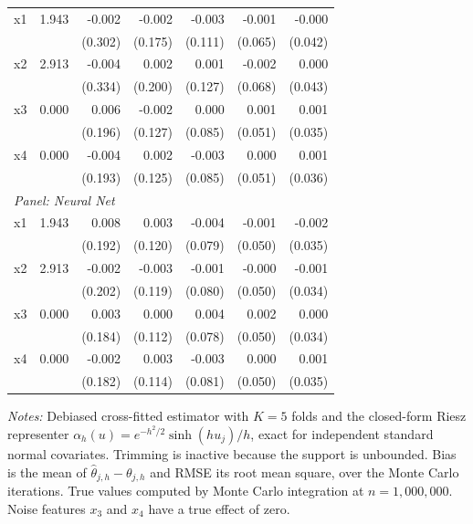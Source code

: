 \documentclass[12pt]{article}
\begin{document}
\begin{table}[htbp]
\begin{threeparttable}
\begin{tabular}{lrrrrrr}
				\quad x1 & 1.943 & -0.002 & -0.002 & -0.003 & -0.001 & -0.000 \\
				&  & (0.302) & (0.175) & (0.111) & (0.065) & (0.042) \\
				\quad x2 & 2.913 & -0.004 & 0.002 & 0.001 & -0.002 & 0.000 \\
				&  & (0.334) & (0.200) & (0.127) & (0.068) & (0.043) \\
				\quad x3 & 0.000 & 0.006 & -0.002 & 0.000 & 0.001 & 0.001 \\
				&  & (0.196) & (0.127) & (0.085) & (0.051) & (0.035) \\
				\quad x4 & 0.000 & -0.004 & 0.002 & -0.003 & 0.000 & 0.001 \\
				&  & (0.193) & (0.125) & (0.085) & (0.051) & (0.036) \\
				\midrule
				\multicolumn{7}{l}{\textit{Panel: Neural Net}} \\
				\quad x1 & 1.943 & 0.008 & 0.003 & -0.004 & -0.001 & -0.002 \\
				&  & (0.192) & (0.120) & (0.079) & (0.050) & (0.035) \\
				\quad x2 & 2.913 & -0.002 & -0.003 & -0.001 & -0.000 & -0.001 \\
				&  & (0.202) & (0.119) & (0.080) & (0.050) & (0.034) \\
				\quad x3 & 0.000 & 0.003 & 0.000 & 0.004 & 0.002 & 0.000 \\
				&  & (0.184) & (0.112) & (0.078) & (0.050) & (0.034) \\
				\quad x4 & 0.000 & -0.002 & 0.003 & -0.003 & 0.000 & 0.001 \\
				&  & (0.182) & (0.114) & (0.081) & (0.050) & (0.035) \\
				\bottomrule
				\end{tabular}
				\begin{tablenotes}
				\footnotesize
				\item \textit{Notes:} Debiased cross-fitted estimator with $K=5$ folds and the closed-form Riesz representer $\alpha_h(u) = e^{-h^2/2}\sinh(h u_j)/h$, exact for independent standard normal covariates. Trimming is inactive because the support is unbounded. Bias is the mean of $\hat{\theta}_{j,h} - \theta_{j,h}$ and RMSE its root mean square, over the Monte Carlo iterations. True values computed by Monte Carlo integration at $n=1{,}000{,}000$. Noise features $x_3$ and $x_4$ have a true effect of zero.
				\end{tablenotes}
		\end{threeparttable}
	\end{table}
	
\end{document}
